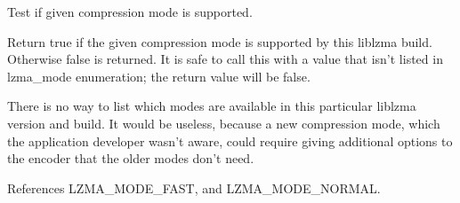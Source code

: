 Test if given compression mode is supported. 

Return true if the given compression mode is supported by this liblzma build. Otherwise false is returned. It is safe to call this with a value that isn't listed in lzma\-\_\-mode enumeration; the return value will be false.

There is no way to list which modes are available in this particular liblzma version and build. It would be useless, because a new compression mode, which the application developer wasn't aware, could require giving additional options to the encoder that the older modes don't need. 

References L\-Z\-M\-A\-\_\-\-M\-O\-D\-E\-\_\-\-F\-A\-S\-T, and L\-Z\-M\-A\-\_\-\-M\-O\-D\-E\-\_\-\-N\-O\-R\-M\-A\-L.

